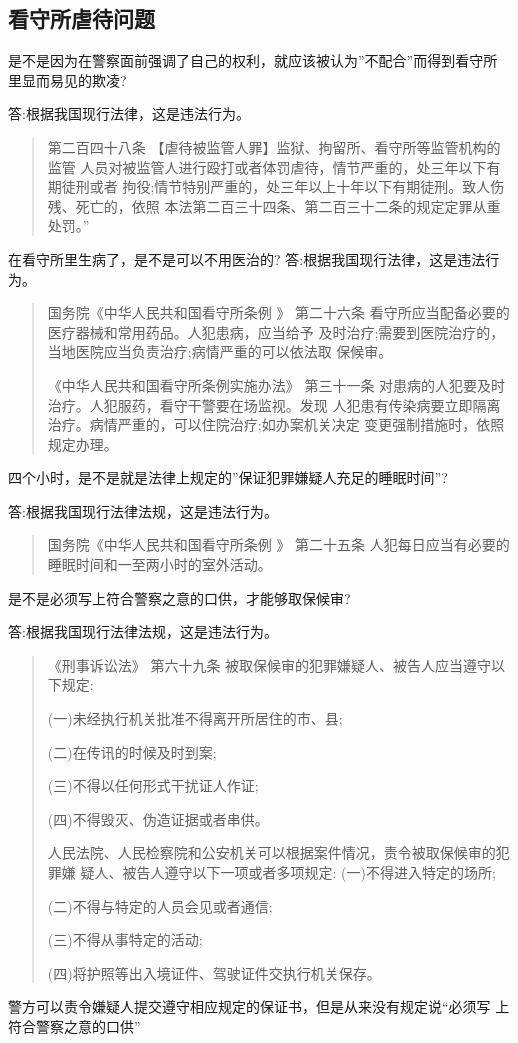 \documentclass{ctexart}
\begin{document}
\subsection{看守所虐待问题}
是不是因为在警察面前强调了自己的权利，就应该被认为”不配合”而得到看守所
里显而易见的欺凌?\par
答:根据我国现行法律，这是违法行为。
\begin{quotation}
  第二百四十八条 【虐待被监管人罪】监狱、拘留所、看守所等监管机构的监管 人员对被监管人进行殴打或者体罚虐待，情节严重的，处三年以下有期徒刑或者 拘役;情节特别严重的，处三年以上十年以下有期徒刑。致人伤残、死亡的，依照 本法第二百三十四条、第二百三十二条的规定定罪从重处罚。”
\end{quotation}
在看守所里生病了，是不是可以不用医治的?
答:根据我国现行法律，这是违法行为。
\begin{quotation}
  国务院《中华人民共和国看守所条例 》
  第二十六条 看守所应当配备必要的医疗器械和常用药品。人犯患病，应当给予 及时治疗;需要到医院治疗的，当地医院应当负责治疗;病情严重的可以依法取 保候审。\par
  《中华人民共和国看守所条例实施办法》
第三十一条 对患病的人犯要及时治疗。人犯服药，看守干警要在场监视。发现 人犯患有传染病要立即隔离治疗。病情严重的，可以住院治疗;如办案机关决定 变更强制措施时，依照规定办理。
\end{quotation}
四个小时，是不是就是法律上规定的”保证犯罪嫌疑人充足的睡眠时间”?\par
答:根据我国现行法律法规，这是违法行为。
\begin{quotation}
  国务院《中华人民共和国看守所条例 》
第二十五条 人犯每日应当有必要的睡眠时间和一至两小时的室外活动。
\end{quotation}
是不是必须写上符合警察之意的口供，才能够取保候审?\par
答:根据我国现行法律法规，这是违法行为。
\begin{quotation}
  《刑事诉讼法》
第六十九条 被取保候审的犯罪嫌疑人、被告人应当遵守以下规定: \par(一)未经执行机关批准不得离开所居住的市、县;\par (二)在传讯的时候及时到案;\par
(三)不得以任何形式干扰证人作证;\par
(四)不得毁灭、伪造证据或者串供。\par 人民法院、人民检察院和公安机关可以根据案件情况，责令被取保候审的犯罪嫌 疑人、被告人遵守以下一项或者多项规定:
(一)不得进入特定的场所;\par (二)不得与特定的人员会见或者通信;\par (三)不得从事特定的活动;\par (四)将护照等出入境证件、驾驶证件交执行机关保存。
\end{quotation}
警方可以责令嫌疑人提交遵守相应规定的保证书，但是从来没有规定说“必须写 上符合警察之意的口供”
\end{document}
